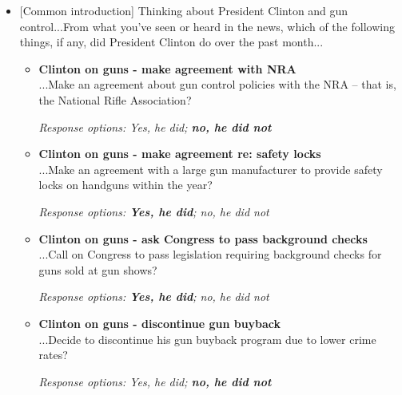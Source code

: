 \documentclass[12pt, letterpaper]{article}
\begin{document}
\begin{itemize}
\item{[Common introduction] Thinking about President Clinton and gun control...From what you've seen or heard in the news, which of the following things, if any, did President Clinton do over the past month...

   \begin{itemize}
\item \textbf{Clinton on guns - make agreement with NRA} \\
...Make an agreement about gun control policies with the NRA -- that is, the National Rifle Association?

\textit{Response options: Yes, he did; \textbf{no, he did not}}
\end{itemize}

   \begin{itemize}
\item \textbf{Clinton on guns - make agreement re: safety locks} \\
...Make an agreement with a large gun manufacturer to provide safety locks on handguns within the year?

\textit{Response options: \textbf{Yes, he did}; no, he did not}
\end{itemize}

   \begin{itemize}
\item \textbf{Clinton on guns - ask Congress to pass background checks} \\
...Call on Congress to pass legislation requiring background checks for guns sold at gun shows?

\textit{Response options: \textbf{Yes, he did}; no, he did not}
\end{itemize}

   \begin{itemize}
\item \textbf{Clinton on guns - discontinue gun buyback} \\
...Decide to discontinue his gun buyback program due to lower crime rates?

\textit{Response options: Yes, he did; \textbf{no, he did not}}
\end{itemize}}
\end{itemize}
\end{document}
